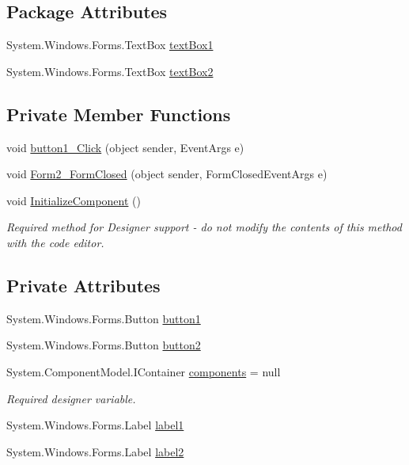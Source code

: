 \subsection*{Package Attributes}
\begin{DoxyCompactItemize}
\item 
System.\+Windows.\+Forms.\+Text\+Box \hyperlink{class__7___doroshenko__forms2__is52_1_1_form2_a65aefea76dfebd897bca2501caa856bf}{text\+Box1}
\item 
System.\+Windows.\+Forms.\+Text\+Box \hyperlink{class__7___doroshenko__forms2__is52_1_1_form2_a10e50e4ee59159ad2e4f5419d36b2a34}{text\+Box2}
\end{DoxyCompactItemize}
\subsection*{Private Member Functions}
\begin{DoxyCompactItemize}
\item 
void \hyperlink{class__7___doroshenko__forms2__is52_1_1_form2_af791f000673bcc783827356e3fae5ce8}{button1\+\_\+\+Click} (object sender, Event\+Args e)
\item 
void \hyperlink{class__7___doroshenko__forms2__is52_1_1_form2_a8698e838d5d9734d53fedba59bfd61eb}{Form2\+\_\+\+Form\+Closed} (object sender, Form\+Closed\+Event\+Args e)
\item 
void \hyperlink{class__7___doroshenko__forms2__is52_1_1_form2_af5ba83f8108664f707d7e82f0481f13a}{Initialize\+Component} ()
\begin{DoxyCompactList}\small\item\em Required method for Designer support -\/ do not modify the contents of this method with the code editor. \end{DoxyCompactList}\end{DoxyCompactItemize}
\subsection*{Private Attributes}
\begin{DoxyCompactItemize}
\item 
System.\+Windows.\+Forms.\+Button \hyperlink{class__7___doroshenko__forms2__is52_1_1_form2_ab9e7d979f5c04ec08cdb7bf458a49404}{button1}
\item 
System.\+Windows.\+Forms.\+Button \hyperlink{class__7___doroshenko__forms2__is52_1_1_form2_a79a4244ff4d4724d7adbdbe18c507101}{button2}
\item 
System.\+Component\+Model.\+I\+Container \hyperlink{class__7___doroshenko__forms2__is52_1_1_form2_a2c42c130f4868ba02465c3191a1830f7}{components} = null
\begin{DoxyCompactList}\small\item\em Required designer variable. \end{DoxyCompactList}\item 
System.\+Windows.\+Forms.\+Label \hyperlink{class__7___doroshenko__forms2__is52_1_1_form2_a59b455b99b00b5cb53fccdb041ffa130}{label1}
\item 
System.\+Windows.\+Forms.\+Label \hyperlink{class__7___doroshenko__forms2__is52_1_1_form2_a2eac22c17685b4f9518ea9c01a5fa74e}{label2}
\end{DoxyCompactItemize}


